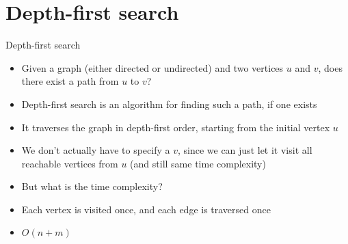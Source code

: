 \documentclass{beamer}
\begin{document}
\section*{Depth-first search}

\begin{frame}[plain]{Depth-first search}
    \begin{itemize}
\item Given a graph (either directed or undirected) and two vertices $u$ and $v$, does there exist a path from $u$ to $v$?
\item Depth-first search is an algorithm for finding such a path, if one exists

\item It traverses the graph in depth-first order, starting from the initial vertex $u$
\item We don't actually have to specify a $v$, since we can just let it visit all reachable vertices from $u$ (and still same time complexity)
\item But what is the time complexity?
\item Each vertex is visited once, and each edge is traversed once
\item $O(n + m)$
    \end{itemize}
\end{frame}
\end{document}
